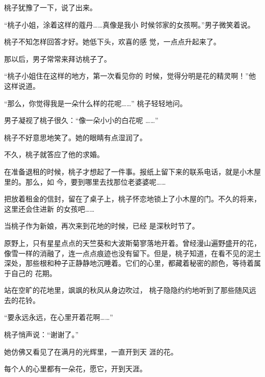 \documentclass{article}
\begin{document}
桃子犹豫了一下，说了出来。 

“桃子小姐，涂着这样的蔻丹……真像是我小
时候邻家的女孩啊。”男子微笑着说。 

桃子不知怎样回答才好。她低下头，欢喜的感
觉，一点点升起来了。 


那以后，男子常常来拜访桃子了。 

“桃子小姐住在这样的地方，第一次看见你的
时候，觉得分明是花的精灵啊！”他这样说道。 

\newpage

“那么，你觉得我是一朵什么样的花呢……”
桃子轻轻地问。 

男子凝视了桃子很久：“像一朵小小的白花呢
……” 

桃子不好意思地笑了。她的眼睛有点湿润了。


不久，桃子就答应了他的求婚。 

在准备退租的时候，桃子才想起了一件事。报纸上留下来的联系电话，就是小木屋里的。那么，如
今，要到哪里去找那位老婆婆呢…… 

把放着租金的信封，留在了桌子上，桃子怀恋地锁上了小木屋的门。不久的将来，这里还会住进新
的女孩吧…… 

当桃子作为新娘，再次来到花地的时候，已经
是深秋时节了。 

\newpage

原野上，只有星星点点的天竺葵和大波斯菊寥落地开着。曾经漫山遍野盛开的花，像雪一样的消融了，连一点点痕迹也没有留下。但是，桃子知道，在看不见的泥土深处，那些根和种子正静静地沉睡着。它们的心里，都藏着秘密的颜色，等待着属于自己的
花期。 

站在空旷的花地里，飒飒的秋风从身边吹过，
桃子隐隐约约地听到了那些随风远去的花铃。 


“要永远永远，在心里开着花啊……” 


桃子悄声说：“谢谢了。” 

她仿佛又看见了在满月的光辉里，一直开到天
涯的花。 

每个人的心里都有一朵花，愿它，开到天涯。
\end{document}

